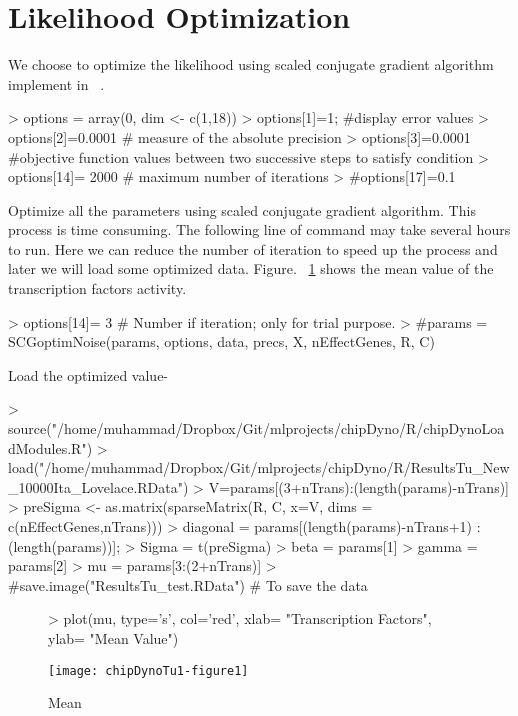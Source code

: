 \documentclass{article}
\begin{document}
\section{Likelihood Optimization}
We choose to optimize the likelihood using scaled conjugate gradient algorithm implement in  ~\cite{nabney:01}. 

\begin{Schunk}
\begin{Sinput}
> options = array(0, dim <- c(1,18))
> options[1]=1; #display error values
> options[2]=0.0001 # measure of the absolute precision
> options[3]=0.0001  #objective function values between two successive steps to satisfy condition
> options[14]= 2000  # maximum number of iterations
> #options[17]=0.1 
\end{Sinput}
\end{Schunk}

Optimize all the parameters using scaled conjugate gradient algorithm. This process is time consuming. The following line of command may take several hours to run. Here we can reduce the number of iteration to speed up the process and later we will load some optimized data. Figure. ~\ref{valMin} shows the mean value of the transcription factors activity.

\begin{Schunk}
\begin{Sinput}
> options[14]= 3 # Number if iteration; only for trial purpose.
> #params = SCGoptimNoise(params, options, data, precs, X, nEffectGenes, R, C)
\end{Sinput}
\end{Schunk}

Load the optimized value-
\begin{Schunk}
\begin{Sinput}
> source("/home/muhammad/Dropbox/Git/mlprojects/chipDyno/R/chipDynoLoadModules.R")
> load("/home/muhammad/Dropbox/Git/mlprojects/chipDyno/R/ResultsTu_New_10000Ita_Lovelace.RData")
> V=params[(3+nTrans):(length(params)-nTrans)]
> preSigma <- as.matrix(sparseMatrix(R, C, x=V, dims = c(nEffectGenes,nTrans)))
> diagonal = params[(length(params)-nTrans+1) :(length(params))];
> Sigma = t(preSigma)%*%preSigma + diag(diagonal*diagonal)
> beta = params[1]
> gamma = params[2]
> mu = params[3:(2+nTrans)]
> #save.image("ResultsTu_test.RData") # To save the data 
\end{Sinput}
\end{Schunk}

\begin{figure}
\begin{Schunk}
\begin{Sinput}
> plot(mu, type='s', col='red', xlab= "Transcription Factors", ylab= "Mean Value")
\end{Sinput}
\end{Schunk}
\texttt{[image: chipDynoTu1-figure1]}
\caption{Mean}
\label{valMin}
\end{figure}
\end{document}
